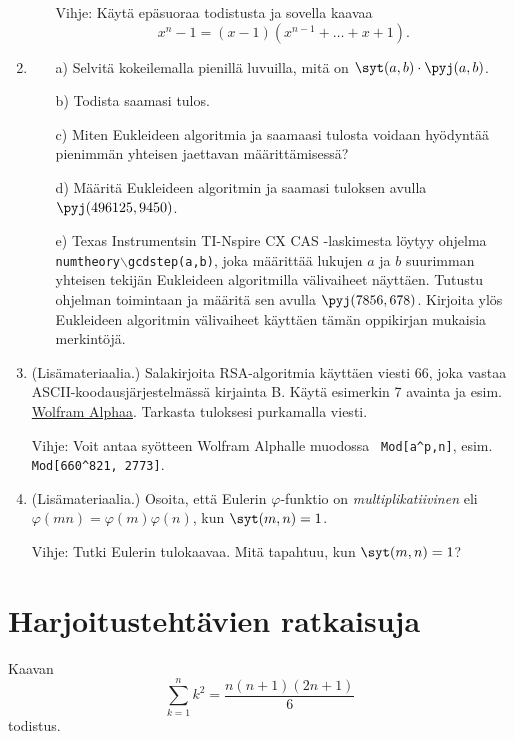 \begin{enumerate}
\begin{itemize}
Vihje: Käytä epäsuoraa todistusta ja sovella kaavaa
\[
x^n-1 = (x-1)(x^{n-1}+\ldots+x+1).
\]
\end{itemize}

\item
\begin{itemize}
\item[a)] Selvitä kokeilemalla pienillä luvuilla, mitä on
$\syt(a,b)\cdot \pyj(a,b)$.
\item[b)] Todista saamasi tulos.
\item[c)] Miten Eukleideen algoritmia ja saamaasi tulosta voidaan
hyödyntää pienimmän yhteisen jaettavan määrittämisessä?
\item[d)] Määritä Eukleideen algoritmin ja saamasi tuloksen
avulla $\pyj(496125,9450)$.
\item[e)] Texas Instrumentsin TI-Nspire CX CAS -laskimesta löytyy
ohjelma {\tt numtheory$\backslash$gcdstep(a,b)}, joka määrittää
lukujen $a$ ja $b$ suurimman yhteisen tekijän Eukleideen
algoritmilla välivaiheet näyttäen. Tutustu ohjelman toimintaan ja
määritä sen avulla $\pyj(7856,678)$. Kirjoita ylös Eukleideen
algoritmin välivaiheet käyttäen tämän oppikirjan mukaisia
merkintöjä.
\end{itemize}

\item (Lisämateriaalia.) Salakirjoita RSA-algoritmia käyttäen
viesti $66$, joka vastaa ASCII-koodausjärjestelmässä kirjainta
B. Käytä esimerkin 7 avainta ja esim. \href{http://
www.wolframalpha.com}{Wolfram Alphaa}. Tarkasta tuloksesi
purkamalla viesti.

Vihje: Voit antaa syötteen Wolfram Alphalle muodossa {\tt
Mod[a\^{}p,n]}, esim. {\tt Mod[660\^{}821, 2773]}.

\item (Lisämateriaalia.) Osoita, että Eulerin $\varphi$-funktio
on {\em multiplikatiivinen} eli $\varphi(mn) = \varphi(m)
\varphi(n)$, kun $\syt(m,n)=1$.

Vihje: Tutki Eulerin tulokaavaa. Mitä tapahtuu, kun $\syt(m,n)
=1$?

\end{enumerate}

\newpage

\chapter{Harjoitustehtävien ratkaisuja}

Kaavan 
\[
\sum_{k=1}^n k^2= \frac{n(n+1)(2n+1)}{6}
\]
todistus.

